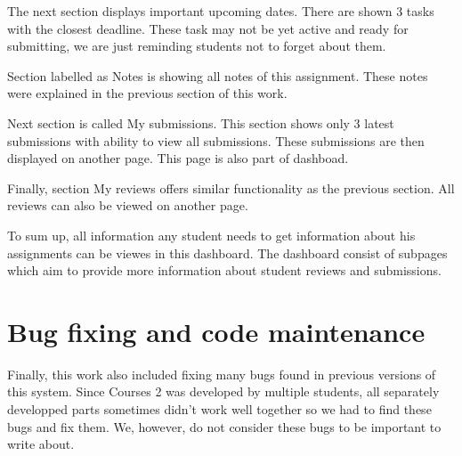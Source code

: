 The next section displays important upcoming dates. There are shown 3 tasks with the closest deadline. These task may not be yet active and ready for submitting, we are just reminding students not to forget about them. 

Section labelled as Notes is showing all notes of this assignment. These notes were explained in the previous section of this work.

Next section is called My submissions. This section shows only 3 latest submissions with ability to view all submissions. These submissions are then displayed on another page. This page is also part of dashboad.

Finally, section My reviews offers similar functionality as the previous section. All reviews can also be viewed on another page.


To sum up, all information any student needs to get information about his assignments can be viewes in this dashboard. The dashboard consist of subpages which aim to provide more information about student reviews and submissions. 

\section{Bug fixing and code maintenance}
Finally, this work also included fixing many bugs found in previous versions of this system. Since Courses 2 was developed by multiple students, all separately developped parts sometimes didn't work well together so we had to find these bugs and fix them. We, however, do not consider these bugs to be important to write about.

